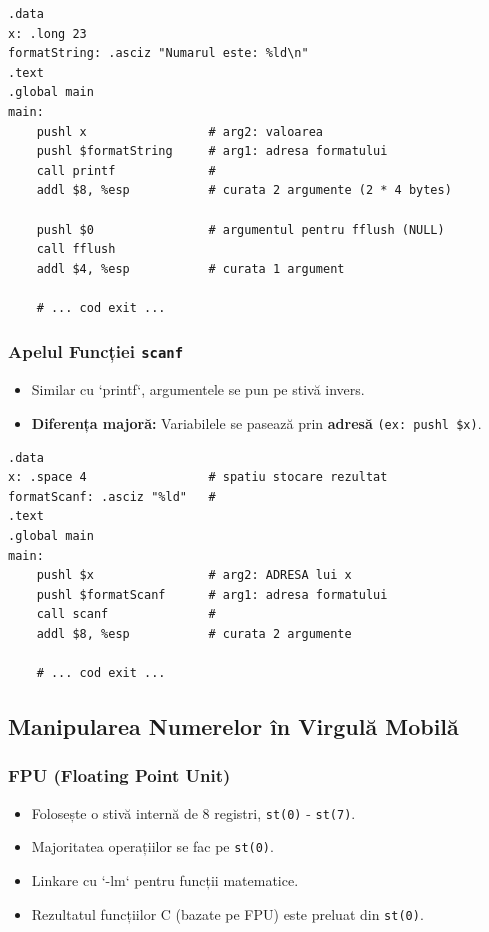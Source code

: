 \documentclass[12pt,a4paper]{article}
\begin{document}
\begin{lstlisting}[language=x86asm]
.data
x: .long 23
formatString: .asciz "Numarul este: %ld\n"
.text
.global main
main:
    pushl x                 # arg2: valoarea
    pushl $formatString     # arg1: adresa formatului
    call printf             #
    addl $8, %esp           # curata 2 argumente (2 * 4 bytes)
    
    pushl $0                # argumentul pentru fflush (NULL)
    call fflush            
    addl $4, %esp           # curata 1 argument

    # ... cod exit ...
\end{lstlisting}

\subsubsection{Apelul Funcției \texttt{scanf}}
\begin{itemize}
    \item Similar cu `printf`, argumentele se pun pe stivă invers.
    \item \textbf{Diferența majoră:} Variabilele se pasează prin \textbf{adresă} \texttt{(ex: pushl \$x)}.
\end{itemize}

\begin{lstlisting}[language=x86asm]
.data
x: .space 4                 # spatiu stocare rezultat
formatScanf: .asciz "%ld"   #
.text
.global main
main:
    pushl $x                # arg2: ADRESA lui x
    pushl $formatScanf      # arg1: adresa formatului
    call scanf              #
    addl $8, %esp           # curata 2 argumente
    
    # ... cod exit ...
\end{lstlisting}

\subsection{Manipularea Numerelor în Virgulă Mobilă}

\subsubsection{FPU (Floating Point Unit)}
\begin{itemize}
    \item Folosește o stivă internă de 8 registri, \texttt{st(0)} - \texttt{st(7)}.
    \item Majoritatea operațiilor se fac pe \texttt{st(0)}.
    \item Linkare cu `-lm` pentru funcții matematice.
    \item Rezultatul funcțiilor C (bazate pe FPU) este preluat din \texttt{st(0)}.
\end{itemize}
\end{document}
